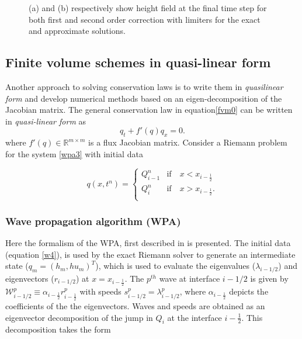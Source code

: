 \documentclass[10pt,a4paper]{article}
\begin{document}
\begin{figure}[H]
\begin{subfigure}[b]{0.5\textwidth}
			\caption{}
			\label{fig:exapp}
		\end{subfigure}
		\caption{(a) and (b) respectively show height field at the final time step for both first and second order correction with limiters for the exact and approximate solutions.}
	\end{figure}
	
	
	\subsection{Finite volume schemes in quasi-linear form}
	Another approach to solving conservation laws is to write  them in  {\em quasilinear form} and develop numerical methods based on an eigen-decomposition of the Jacobian matrix. The general conservation law in equation\eqref{fvm0} can be written in {\em quasi-linear form}
	as
	\begin{equation}
		q_{t} + f'(q)q_{x} = 0.
		\label{wpa3}
	\end{equation}
	where  $f'(q) \in \mathbb{R}^{m\times m}$  is a flux Jacobian matrix.  Consider a Riemann problem for the system  \eqref{wpa3} with initial data 
	
	\begin{equation}
		q(x,t^n)  = \begin{cases}
			Q_{i-1}^{n}  & \text{if} \quad  x < x_{i-\frac{1}{2}}\\
			Q_{i}^{n} & \text{if} \quad x > x_{i-\frac{1}{2}}.\\
		\end{cases}    
		\label{w4}   
	\end{equation}
	\subsubsection{Wave propagation algorithm (WPA)}
	Here the formalism of the WPA, first described in  \citet{le:1997} is presented.   The initial data (equation \eqref{w4}), is used by the exact Riemann solver to generate an intermediate state ($q_m = (h_m, hu_m)^T$), which is used to evaluate the eigenvalues ($\lambda_{i-1/2}$) and eigenvectors ($r_{i-1/2}$) at $x = x_{i-\frac{1}{2}}$. The $p^{th}$ wave at interface $i-1/2$ is given by $\mathcal W^p_{i-1/2} \equiv \alpha_{i-\frac{1}{2}} r^p_{i-\frac{1}{2}}$ with speeds $s^p_{i-1/2} = \lambda^p_{i-1/2}$, where $ \alpha_{i-\frac{1}{2}}$ depicts the coefficients of the the eigenvectors.  Waves and speeds are obtained as an eigenvector decomposition of the jump in $Q_i$ at the interface $i-\frac{1}{2}$.  This decomposition takes the form
	
\end{document}
